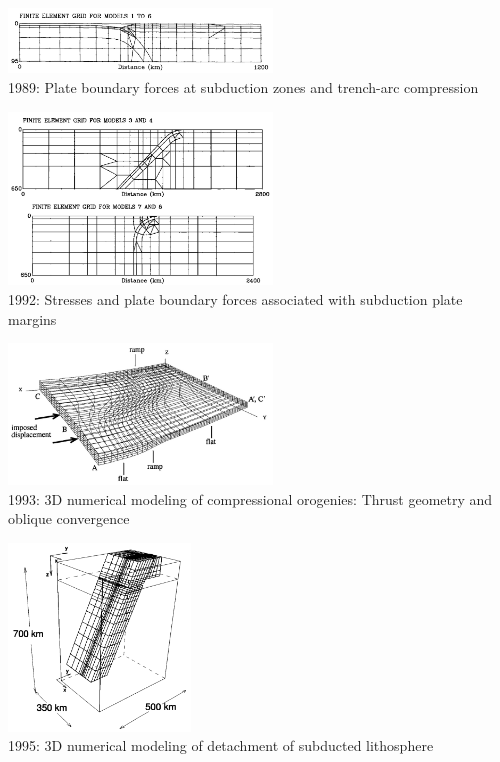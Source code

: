 \begin{center}
\includegraphics[width=7cm]{images/history/boww89}\\
{\small 1989: Plate boundary forces at subduction zones and trench-arc compression \cite{boww89}}
\end{center}

\begin{center}
\includegraphics[width=7cm]{images/history/whbw92}\\
{\small 1992: Stresses and plate boundary forces associated with subduction plate margins
\cite{whbw92}}
\end{center}

\begin{center}
\includegraphics[width=7cm]{images/history/brau93}\\
{\small 1993: 3D numerical modeling of
compressional orogenies: Thrust geometry and
oblique convergence \cite{brau93}}
\end{center}

\begin{center}
\includegraphics[height=5cm]{images/history/yowo95}\\
{\small 1995: 3D numerical modeling of detachment of subducted 
lithosphere \cite{yowo95}}
\end{center}


